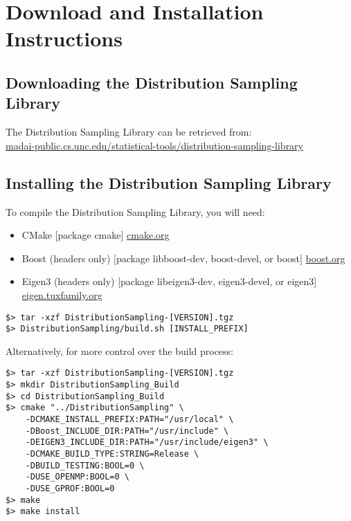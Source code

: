 \section{Download and Installation Instructions}\label{sec:download}

\subsection{Downloading the Distribution Sampling Library}

The Distribution Sampling Library can be retrieved from: \\
\href{https://madai-public.cs.unc.edu/statistical-tools/distribution-sampling-library/}{madai-public.cs.unc.edu/statistical-tools/distribution-sampling-library}

\subsection{Installing the Distribution Sampling Library}

To compile the Distribution Sampling Library, you will need:
\begin{itemize}
\item CMake [package cmake] \href{http://www.cmake.org/cmake/resources/software.html}{cmake.org}
\item Boost (headers only) [package libboost-dev, boost-devel, or boost] \href{http://www.boost.org/users/download/}{boost.org}
\item Eigen3 (headers only) [package libeigen3-dev, eigen3-devel, or eigen3]
\href{http://eigen.tuxfamily.org/}{eigen.tuxfamily.org}
\end{itemize}

\begin{verbatim}
$> tar -xzf DistributionSampling-[VERSION].tgz
$> DistributionSampling/build.sh [INSTALL_PREFIX]
\end{verbatim}

Alternatively, for more control over the build process:

\begin{verbatim}
$> tar -xzf DistributionSampling-[VERSION].tgz
$> mkdir DistributionSampling_Build
$> cd DistributionSampling_Build
$> cmake "../DistributionSampling" \
    -DCMAKE_INSTALL_PREFIX:PATH="/usr/local" \
    -DBoost_INCLUDE_DIR:PATH="/usr/include" \
    -DEIGEN3_INCLUDE_DIR:PATH="/usr/include/eigen3" \
    -DCMAKE_BUILD_TYPE:STRING=Release \
    -DBUILD_TESTING:BOOL=0 \
    -DUSE_OPENMP:BOOL=0 \
    -DUSE_GPROF:BOOL=0
$> make
$> make install
\end{verbatim}



